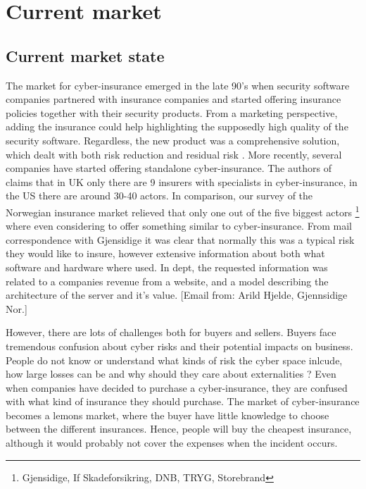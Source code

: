 \chapter{Current market}
\label{chp:hvahardenneaasi??} 
\section{Current market state}



The market for cyber-insurance emerged in the late 90's when security software companies partnered with insurance companies and started offering insurance policies together with their security products. From a marketing perspective, adding the insurance could help highlighting the supposedly high quality of the security software. Regardless, the new product was a comprehensive solution, which dealt with both risk reduction and residual risk \cite{bolot2008new}. More recently, several companies have started offering standalone cyber-insurance. The authors of \cite{evolvingcyber} claims that in UK only there are 9 insurers with specialists in cyber-insurance, in the US there are around 30-40 actors. In comparison, our survey of the Norwegian insurance market relieved that only one out of the five biggest actors \footnote{Gjensidige, If Skadeforsikring, DNB, TRYG, Storebrand} where even considering to offer something similar to cyber-insurance. From mail correspondence with Gjensidige it was clear that normally this was a typical risk they would like to insure, however extensive information about both what software and hardware where used. In dept, the requested information was related to a companies revenue from a website, and a model describing the architecture of the server and it's value. 
[Email from: Arild Hjelde, Gjennsidige Nor.]


However, there are lots of challenges both for buyers and sellers. 
Buyers face tremendous confusion about cyber risks and their potential impacts on business. 
People do not know or understand what kinds of risk the cyber space inlcude, 
how large losses can be and why should they care about externalities \cite{Cyberworkshop}?
Even when companies have decided to purchase a cyber-insurance, they are confused with what kind of insurance they should purchase.
The market of cyber-insurance becomes a lemons market, where the buyer have little knowledge to choose between the different insurances. 
Hence, people will buy the cheapest insurance, although it would probably not cover the expenses when the incident occurs. 

